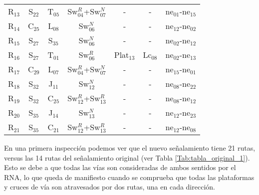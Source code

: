 \begin{table}[H]
{{\begin{tabular}{ c c c c c c c }
                    R$_{13}$  & S$_{22}$ & T$_{05}$ & Sw$_{04}^{R}$+Sw$_{07}^{N}$ & - & - & ne$_{01}$-ne$_{15}$\\
                    R$_{14}$  & C$_{25}$ & L$_{08}$ & Sw$_{06}^{N}$ & - & - & ne$_{12}$-ne$_{02}$\\
                    R$_{15}$  & S$_{27}$ & S$_{35}$ & Sw$_{06}^{N}$ & - & - & ne$_{02}$-ne$_{12}$\\
                    R$_{16}$  & S$_{27}$ & T$_{01}$ & Sw$_{06}^{R}$ & Plat$_{13}$ & Lc$_{08}$ & ne$_{02}$-ne$_{13}$\\
                    R$_{17}$  & C$_{29}$ & L$_{07}$ & Sw$_{04}^{R}$+Sw$_{07}^{N}$ & - & - & ne$_{15}$-ne$_{01}$\\
                    R$_{18}$  & S$_{32}$ & J$_{11}$ & Sw$_{12}^{N}$ & - & - & ne$_{08}$-ne$_{22}$\\
                    R$_{19}$  & S$_{32}$ & C$_{25}$ & Sw$_{12}^{R}$+Sw$_{13}^{R}$ & - & - & ne$_{08}$-ne$_{12}$\\
                    R$_{20}$  & S$_{35}$ & J$_{14}$ & Sw$_{13}^{N}$ & - & - & ne$_{12}$-ne$_{23}$\\
                    R$_{21}$  & S$_{35}$ & C$_{21}$ & Sw$_{12}^{R}$+Sw$_{13}^{R}$ & - & - & ne$_{12}$-ne$_{08}$\\
                \hline
            \end{tabular}
        }
     }
    \end{table}
    
    En una primera inspección podemos ver que el nuevo señalamiento tiene 21 rutas, versus las 14 rutas del señalamiento original (ver Tabla \ref{Tab:tabla_original_1}). Esto se debe a que todas las vías son consideradas de ambos sentidos por el RNA, lo que queda de manifiesto cuando se comprueba que todas las plataformas y cruces de vía son atravesados por dos rutas, una en cada dirección. 